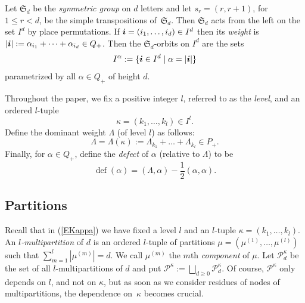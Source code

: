 \documentclass[twoside,11pt,reqno]{amsart}
\numberwithin{equation}{section}
\theoremstyle{definition}  %
\def\bi{\text{\boldmath$i$}}
\newcommand{\0}{{\bar 0}}
\newcommand{\1}{{\bar 1}}
\newcommand{\La}{\Lambda}
\newcommand{\al}{\alpha}
\def\Si{\mathfrak{S}}
\newcommand\Par[1][]{{\mathscr P}^{\kappa#1}}
\def\defect{\operatorname{def}}
\begin{document}
Let $\Si_d$ be the {\em symmetric group} on $d$ letters and let $s_r=(r,r+1)$, for $1\le r<d$, be the simple transpositions of~$\Si_d$. Then $\Si_d$
acts from the left on the set $ I^d$ by place permutations. If $\bi=(i_1,\dots,i_d) \in I^d$
then its {\em weight} is $|\bi|:=\alpha_{i_1}+\cdots+\alpha_{i_d}\in Q_+$.  Then the
$\Si_d$-orbits on $I^d$ are the sets 
\begin{equation*} I^\alpha := \{\bi \in I^d\mid \al=|\bi|\} 
\end{equation*} 
parametrized by all $\alpha \in Q_+$ of height $d$. 

Throughout the paper, we fix a positive integer $l$, referred to as the {\em level},  and an ordered $l$-tuple  
\begin{equation}\label{EKappa}
\kappa=(k_1,\dots,k_l)\in I^l.
\end{equation}
Define the dominant weight $\La$ (of level $l$) as follows:  
\begin{equation}\label{ELa}
\La=\La(\kappa):=\La_{k_1}+\dots+\La_{k_l}\in P_+.
\end{equation}
Finally, for $\al\in Q_+$, define the {\em defect} of $\al$ (relative to $\La$) to be
\begin{equation}\label{defdef}
\defect(\al)=(\La,\al)-\frac12(\al,\al).
\end{equation}


\subsection{Partitions}\label{SSPar}
Recall that in (\ref{EKappa}) we have fixed a level $l$ and an $l$-tuple
$\kappa=(k_1,\dots,k_l)$.  An {\em $l$-multipartition} of $d$ is an ordered $l$-tuple
of partitions $\mu = (\mu^{(1)} , \dots,\mu^{(l)})$ such that $\sum_{m=1}^l
|\mu^{(m)}|=d$.  We call $\mu^{(m)}$ the $m$th {\em component} of $\mu$. 
Let $\Par_d$ be the set of all $l$-multipartitions of $d$  and put $\Par:=\bigsqcup_{d\geq 0}\Par_d$. Of course, $\Par$ only depends on $l$, and not on $\kappa$, but as soon as we consider residues of nodes of multipartitions, the dependence on~$\kappa$ becomes  crucial. 
\end{document}
